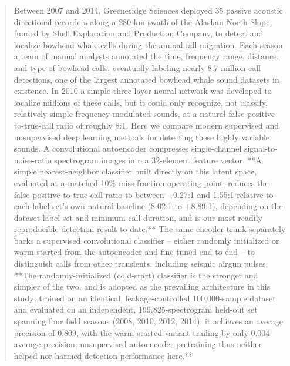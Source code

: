 \documentclass[preprint,NumberedRefs]{JASAnew}
\begin{document}
\begin{abstract}

Between 2007 and 2014, Greeneridge Sciences deployed 35 passive acoustic directional recorders along a 280 km swath of the Alaskan North Slope, funded by Shell Exploration and Production Company, to detect and localize bowhead whale calls during the annual fall migration. Each season a team of manual analysts annotated the time, frequency range, distance, and type of bowhead calls, eventually labeling nearly 8.7 million call detections, one of the largest annotated bowhead whale sound datasets in existence. In 2010 a simple three-layer neural network was developed to localize millions of these calls, but it could only recognize, not classify, relatively simple frequency-modulated sounds, at a natural false-positive-to-true-call ratio of roughly 8:1. Here we compare modern supervised and unsupervised deep learning methods for detecting these highly variable sounds. A convolutional autoencoder compresses single-channel signal-to-noise-ratio spectrogram images into a 32-element feature vector. **A simple nearest-neighbor classifier built directly on this latent space, evaluated at a matched 10\% miss-fraction operating point, reduces the false-positive-to-true-call ratio to between {+}0.27:1 and 1.55:1 relative to each label set's own natural baseline (8.02:1 to {+}8.89:1), depending on the dataset label set and minimum call duration, and is our most readily reproducible detection result to date.** The same encoder trunk separately backs a supervised convolutional classifier -- either randomly initialized or warm-started from the autoencoder and fine-tuned end-to-end -- to distinguish calls from other transients, including seismic airgun pulses. **The randomly-initialized (cold-start) classifier is the stronger and simpler of the two, and is adopted as the prevailing architecture in this study; trained on an identical, leakage-controlled 100,000-sample dataset and evaluated on an independent, 199,825-spectrogram held-out set spanning four field seasons (2008, 2010, 2012, 2014), it achieves an average precision of 0.809, with the warm-started variant trailing by only 0.004 average precision; unsupervised autoencoder pretraining thus neither helped nor harmed detection performance here.**
\end{abstract}


\maketitle
\end{document}
